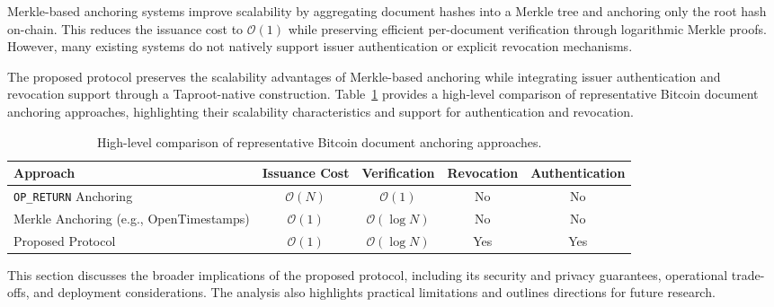 \documentclass[preprint,12pt]{elsarticle}
\begin{document}
Merkle-based anchoring systems improve scalability by aggregating document hashes into a Merkle tree and anchoring only the root hash on-chain. 
This reduces the issuance cost to $\mathcal{O}(1)$ while preserving efficient per-document verification through logarithmic Merkle proofs. 
However, many existing systems do not natively support issuer authentication or explicit revocation mechanisms.

The proposed protocol preserves the scalability advantages of Merkle-based anchoring while integrating issuer authentication and revocation support through a Taproot-native construction. 
Table~\ref{tab:approach_comparison} provides a high-level comparison of representative Bitcoin document anchoring approaches, highlighting their scalability characteristics and support for authentication and revocation.

\begin{table}[t]
\centering
\caption{High-level comparison of representative Bitcoin document anchoring approaches.}
\label{tab:approach_comparison}
\small
\renewcommand{\arraystretch}{1.2}

\begin{adjustbox}{max width=\linewidth}
\begin{tabular}{
>{\raggedright\arraybackslash}m{4.5cm}
c c c c
}
\toprule
\textbf{Approach} &
\textbf{Issuance Cost} &
\textbf{Verification} &
\textbf{Revocation} &
\textbf{Authentication} \\
\midrule

\texttt{OP\_RETURN} Anchoring &
$\mathcal{O}(N)$ &
$\mathcal{O}(1)$ &
No &
No \\

Merkle Anchoring (e.g., OpenTimestamps) &
$\mathcal{O}(1)$ &
$\mathcal{O}(\log N)$ &
No &
No \\

Proposed Protocol &
$\mathcal{O}(1)$ &
$\mathcal{O}(\log N)$ &
Yes &
Yes \\

\bottomrule
\end{tabular}
\end{adjustbox}

\end{table}

This section discusses the broader implications of the proposed protocol, including its security and privacy guarantees, operational trade-offs, and deployment considerations. The analysis also highlights practical limitations and outlines directions for future research.
\end{document}
